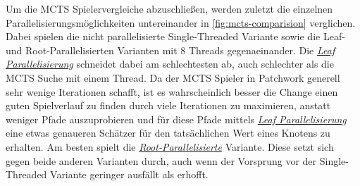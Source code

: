Um die \ac{MCTS} Spielervergleiche abzuschließen, werden zuletzt die einzelnen Parallelisierungsmöglichkeiten untereinander in \ref{fig:mcts-comparision} verglichen. Dabei spielen die nicht parallelisierte Single-Threaded Variante sowie die Leaf- und Root-Parallelisierten Varianten mit 8 Threads gegenaeinander. Die \hyperref[text:leaf-parallelization]{\emph{Leaf Parallelisierung}} schneidet dabei am schlechtesten ab, auch schlechter als die \ac{MCTS} Suche mit einem Thread. Da der \ac{MCTS} Spieler in Patchwork generell sehr wenige Iterationen schafft, ist es wahrscheinlich besser die Change einen guten Spielverlauf zu finden durch viele Iterationen zu maximieren, anstatt weniger Pfade auszuprobieren und für diese Pfade mittels \hyperref[text:leaf-parallelization]{\emph{Leaf Parallelisierung}} eine etwas genaueren Schätzer für den tatsächlichen Wert eines Knotens zu erhalten. Am besten spielt die \hyperref[text:root-parallelization]{\emph{Root-Parallelisierte}} Variante. Diese setzt sich gegen beide anderen Varianten durch, auch wenn der Vorsprung vor der Single-Threaded Variante geringer ausfällt als erhofft.

